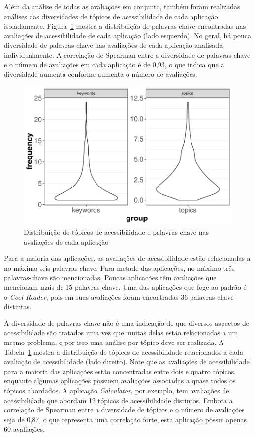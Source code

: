 Além da análise de todas as avaliações em conjunto, também foram realizadas análises das diversidades de tópicos de acessibilidade de cada aplicação isoladamente. 
Figura~\ref{fig:distributiontopicsapps} mostra a distribuição de palavras-chave encontradas nas avaliações de acessibilidade de cada aplicação (lado esquerdo). 
No geral, há pouca diversidade de palavras-chave nas avaliações de cada aplicação analisada individualmente. 
A correlação de Spearman entre a diversidade de palavras-chave e o número de avaliações em cada aplicação é de 0,93, o que indica que a diversidade aumenta conforme aumenta o número de avaliações.


\begin{figure}[!htb]
\centering
\includegraphics[scale=0.8]{imagens/distribution-topics-keywords.pdf}
\caption{Distribuição de tópicos de acessibilidade e palavras-chave nas avaliações de cada aplicação}
\label{fig:distributiontopicsapps}
\end{figure}


Para a maioria das aplicações, as avaliações de acessibilidade estão relacionadas a no máximo seis palavras-chave. 
Para metade das aplicações, no máximo três palavras-chave são mencionadas. 
Poucas aplicações têm avaliações que mencionam mais de 15 palavras-chave. 
Uma das aplicações que foge ao padrão é o \textit{Cool Reader}, pois em suas avaliações foram encontradas 36 palavras-chave distintas. 


A diversidade de palavras-chave não é uma indicação de que diversos aspectos de acessibilidade são tratados uma vez que muitas delas estão relacionadas a um mesmo problema, e por isso uma análise por tópico deve ser realizada. 
A Tabela~\ref{fig:distributiontopicsapps} mostra a distribuição de tópicos de acessibilidade relacionados a cada avaliação de acessibilidade (lado direito). 
Note que as avaliações de acessibilidade para a maioria das aplicações estão concentradas entre dois e quatro tópicos, enquanto algumas aplicações possuem avaliações associadas a quase todos os tópicos abordados. 
A aplicação \textit{Calculator}, por exemplo, tem avaliações de acessibilidade que abordam 12 tópicos de acessibilidade distintos. 
Embora a correlação de Spearman entre a diversidade de tópicos e o número de avaliações seja de 0,87, o que representa uma correlação forte, esta aplicação possui apenas 60 avaliações. \newline


